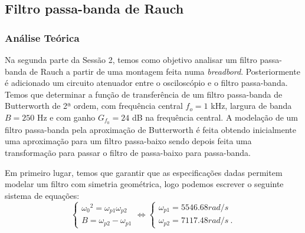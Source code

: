 \subsection{Filtro passa-banda de Rauch} \label{filtro_rauch}

\subsubsection{Análise Teórica}


Na segunda parte da Sessão 2, temos como objetivo analisar um filtro passa-banda de Rauch a partir de uma montagem feita numa \textit{breadbord}. Posteriormente é adicionado um circuito atenuador entre o osciloscópio e o filtro passa-banda. Temos que determinar a função de transferência de um filtro passa-banda de Butterworth de 2ª ordem, com frequência central $f_o = 1$ kHz, largura de banda $B =250$ Hz e com ganho $G_{f_0} = 24$ dB na frequência central. A modelação de um filtro passa-banda pela aproximação de Butterworth é feita obtendo inicialmente uma aproximação para um filtro passa-baixo sendo depois feita uma transformação para passar o filtro de passa-baixo para passa-banda.\par
Em primeiro lugar, temos que garantir que as especificações dadas permitem modelar um filtro com simetria geométrica, logo podemos escrever o seguinte sistema de equações:
\begin{equation*}
    \begin{cases}
    {\omega_0}^2= \omega_{p1} \omega_{p2} \\
    B=\omega_{p2}- \omega_{p1}
    \end{cases} \Leftrightarrow
    \begin{cases}
    \omega_{p1}= 5546.68 rad/s \\
    \omega_{p2}=7117.48 rad/s \: .
    \end{cases}
\end{equation*}

